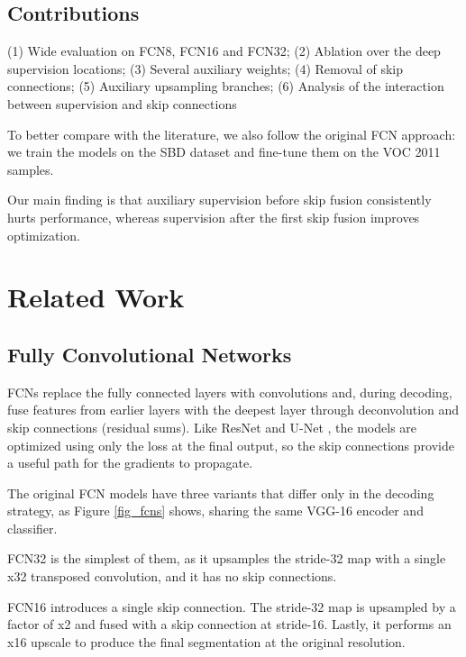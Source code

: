 \documentclass[runningheads]{llncs}
\begin{document}

    
    \subsection{Contributions}
    
    (1) Wide evaluation on FCN8, FCN16 and FCN32; (2) Ablation over the deep supervision locations; (3) Several auxiliary weights; (4) Removal of skip connections; (5) Auxiliary upsampling branches; (6) Analysis of the interaction between supervision and skip connections
    
    To better compare with the literature, we also follow the original FCN approach: we train the models on the SBD dataset and fine-tune them on the VOC 2011 samples.

    Our main finding is that auxiliary supervision before skip fusion consistently hurts performance, whereas supervision after the first skip fusion improves optimization.
    

\section{Related Work}

    \subsection{Fully Convolutional Networks}
    FCNs \cite{ref_fcn} replace the fully connected layers with convolutions and, during decoding, fuse features from earlier layers with the deepest layer through deconvolution and skip connections (residual sums). Like ResNet \cite{ref_resnet} and U-Net \cite{ref_unet}, the models are optimized using only the loss at the final output, so the skip connections provide a useful path for the gradients to propagate.

    The original FCN models have three variants that differ only in the decoding strategy, as Figure \ref{fig_fcns} shows, sharing the same VGG-16 encoder and classifier.
    
    FCN32 is the simplest of them, as it upsamples the stride-32 map with a single x32 transposed convolution, and it has no skip connections.
    
    FCN16 introduces a single skip connection. The stride-32 map is upsampled by a factor of x2 and fused with a skip connection at stride-16. Lastly, it performs an x16 upscale to produce the final segmentation at the original resolution.
    
\end{document}
